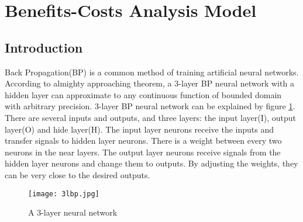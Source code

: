 \documentclass[12pt]{article}%
\newcommand{\upcite}[1]{\textsuperscript{\textsuperscript{\cite{#1}}}}%
\begin{document}
\section{Benefits-Costs Analysis Model}
\subsection{Introduction}
	Back Propagation(BP) is a common method of training artificial neural networks. According to almighty approaching theorem, a 3-layer BP neural network with a hidden layer can approximate to any continuous function of bounded domain with arbitrary precision.\upcite{wanneng} 3-layer BP neural network can be explained by figure \ref{3lbp}. There are several inputs and outputs, and three layers: the input layer(I), output layer(O) and hide layer(H). The input layer neurons receive the inputs and transfer signals to hidden layer neurons. There is a weight between every two neurons in the near layers. The output layer neurons receive signals from the hidden layer neurons and change them to outputs. By adjusting the weights, they can be very close to the desired outputs.
\begin{figure}[H]
	\centering
	\texttt{[image: 3lbp.jpg]}
	\caption{A 3-layer neural network}
	\label{3lbp}
\end{figure}
\end{document}
